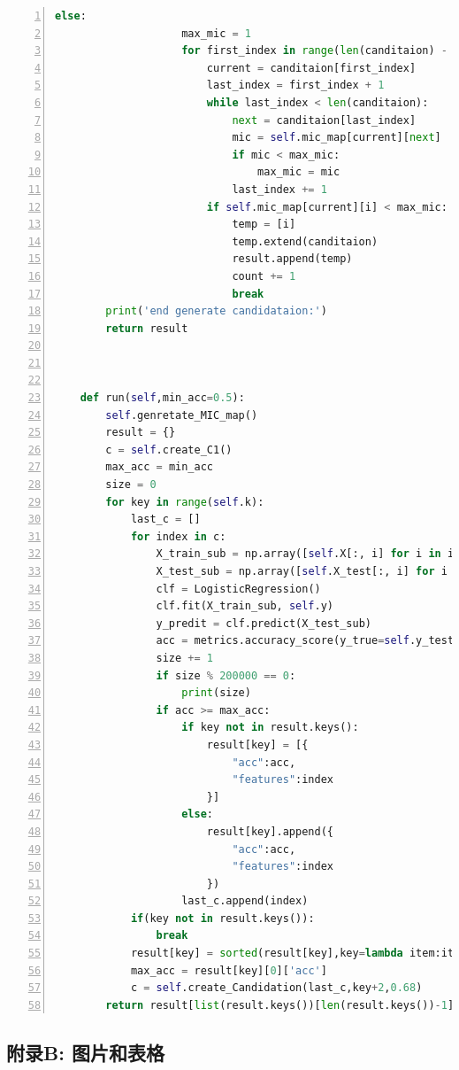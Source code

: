 \documentclass{njubachelor}
\begin{document}
\begin{lstlisting}[language=python,numbers=left]
                else:
                    max_mic = 1
                    for first_index in range(len(canditaion) - 1):
                        current = canditaion[first_index]
                        last_index = first_index + 1
                        while last_index < len(canditaion):
                            next = canditaion[last_index]
                            mic = self.mic_map[current][next]
                            if mic < max_mic:
                                max_mic = mic
                            last_index += 1
                        if self.mic_map[current][i] < max_mic:
                            temp = [i]
                            temp.extend(canditaion)
                            result.append(temp)
                            count += 1
                            break
        print('end generate candidataion:')
        return result



    def run(self,min_acc=0.5):
        self.genretate_MIC_map()
        result = {}
        c = self.create_C1()
        max_acc = min_acc
        size = 0
        for key in range(self.k):
            last_c = []
            for index in c:
                X_train_sub = np.array([self.X[:, i] for i in index]).T
                X_test_sub = np.array([self.X_test[:, i] for i in index]).T
                clf = LogisticRegression()
                clf.fit(X_train_sub, self.y)
                y_predit = clf.predict(X_test_sub)
                acc = metrics.accuracy_score(y_true=self.y_test, y_pred=y_predit)
                size += 1
                if size % 200000 == 0:
                    print(size)
                if acc >= max_acc:
                    if key not in result.keys():
                        result[key] = [{
                            "acc":acc,
                            "features":index
                        }]
                    else:
                        result[key].append({
                            "acc":acc,
                            "features":index
                        })
                    last_c.append(index)
            if(key not in result.keys()):
                break
            result[key] = sorted(result[key],key=lambda item:item["acc"], reverse=True)
            max_acc = result[key][0]['acc']
            c = self.create_Candidation(last_c,key+2,0.68)
        return result[list(result.keys())[len(result.keys())-1]][0]["features"]
\end{lstlisting}
\newpage


\subsection{附录B: 图片和表格}
\end{document}
